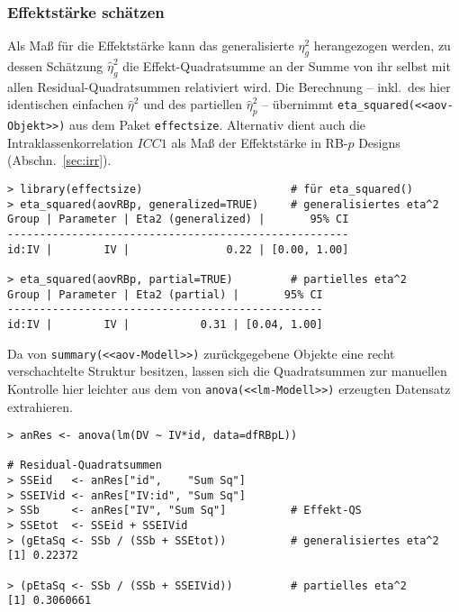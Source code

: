 \subsubsection{Effektstärke schätzen}

Als Maß für die Effektstärke kann das generalisierte $\eta_{g}^{2}$ herangezogen werden, zu dessen Schätzung $\hat{\eta}_{g}^{2}$ die Effekt-Quadratsumme an der Summe von ihr selbst mit allen Residual-Quadratsummen relativiert wird. Die Berechnung -- inkl.\ des hier identischen einfachen $\hat{\eta}^{2}$ und des partiellen $\hat{\eta}_{p}^{2}$ -- übernimmt \lstinline!eta_squared(<<aov-Objekt>>)! aus dem Paket \lstinline!effectsize!. Alternativ dient auch die Intraklassenkorrelation $ICC1$ als Maß der Effektstärke in RB-$p$ Designs (Abschn.\ \ref{sec:irr}).
\begin{lstlisting}
> library(effectsize)                       # für eta_squared()
> eta_squared(aovRBp, generalized=TRUE)     # generalisiertes eta^2
Group | Parameter | Eta2 (generalized) |       95% CI
-----------------------------------------------------
id:IV |        IV |               0.22 | [0.00, 1.00]

> eta_squared(aovRBp, partial=TRUE)         # partielles eta^2
Group | Parameter | Eta2 (partial) |       95% CI
-------------------------------------------------
id:IV |        IV |           0.31 | [0.04, 1.00]
\end{lstlisting}

Da von \lstinline!summary(<<aov-Modell>>)! zurückgegebene Objekte eine recht verschachtelte Struktur besitzen, lassen sich die Quadratsummen zur manuellen Kontrolle hier leichter aus dem von \lstinline!anova(<<lm-Modell>>)! erzeugten Datensatz extrahieren.
\begin{lstlisting}
> anRes <- anova(lm(DV ~ IV*id, data=dfRBpL))

# Residual-Quadratsummen
> SSEid   <- anRes["id",    "Sum Sq"]
> SSEIVid <- anRes["IV:id", "Sum Sq"]
> SSb     <- anRes["IV", "Sum Sq"]          # Effekt-QS
> SSEtot  <- SSEid + SSEIVid
> (gEtaSq <- SSb / (SSb + SSEtot))          # generalisiertes eta^2
[1] 0.22372

> (pEtaSq <- SSb / (SSb + SSEIVid))         # partielles eta^2
[1] 0.3060661
\end{lstlisting}

